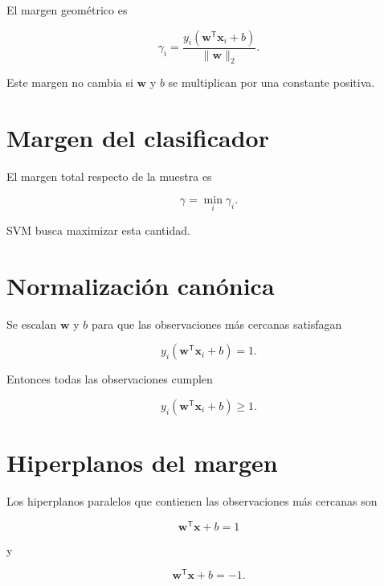 \documentclass[
  spanish,
  10.5pt,
  letterpaper,
  DIV=11,
  numbers=noendperiod,
  oneside,
  open=any]{scrreprt}
\theoremstyle{definition}
\theoremstyle{definition}
\theoremstyle{plain}
\theoremstyle{remark}
\begin{document}

El margen geométrico es

\[
\gamma_i
=
\frac{
y_i
\left(
\mathbf{w}^{\mathsf T}\mathbf{x}_i+b
\right)
}{
\|\mathbf{w}\|_2
}.
\]

Este margen no cambia si \(\mathbf{w}\) y \(b\) se multiplican por una
constante positiva.

\section*{Margen del clasificador}\label{margen-del-clasificador}


El margen total respecto de la muestra es

\[
\gamma
=
\min_{i}
\gamma_i.
\]

SVM busca maximizar esta cantidad.

\section*{Normalización canónica}\label{normalizaciuxf3n-canuxf3nica}


Se escalan \(\mathbf{w}\) y \(b\) para que las observaciones más
cercanas satisfagan

\[
y_i
\left(
\mathbf{w}^{\mathsf T}\mathbf{x}_i+b
\right)
=
1.
\]

Entonces todas las observaciones cumplen

\[
y_i
\left(
\mathbf{w}^{\mathsf T}\mathbf{x}_i+b
\right)
\geq 1.
\]

\section*{Hiperplanos del margen}\label{hiperplanos-del-margen}


Los hiperplanos paralelos que contienen las observaciones más cercanas
son

\[
\mathbf{w}^{\mathsf T}\mathbf{x}+b=1
\]

y

\[
\mathbf{w}^{\mathsf T}\mathbf{x}+b=-1.
\]
\end{document}
